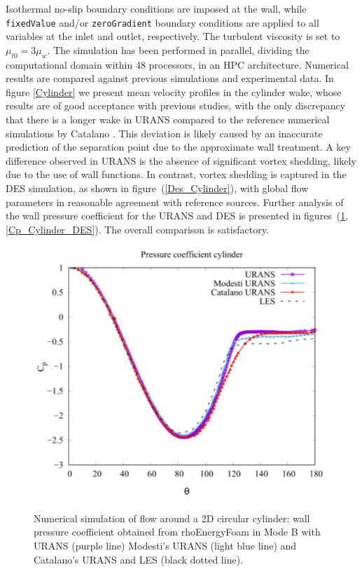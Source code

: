\documentclass[a5paper]{sapthesis}
\begin{document}
	\noindent Isothermal no-slip boundary conditions are imposed at the wall, while \texttt{fixedValue} and/or \texttt{zeroGradient} boundary conditions are applied to all variables at the inlet and outlet, respectively. The turbulent viscosity is set to $\mu_{t0} = 3\mu_w$. The simulation has been performed in parallel, dividing the computational domain within 48 processors, in an HPC architecture. Numerical results are compared against previous simulations and experimental data. In figure \ref{Cylinder} we present mean velocity profiles in the cylinder wake, whose results are of good acceptance with previous studies, with the only discrepancy that there is a longer wake in URANS compared to the reference numerical simulations by Catalano \cite{Catalano}. This deviation is likely caused by an inaccurate prediction of the separation point due to the approximate wall treatment. A key difference observed in URANS is the absence of significant vortex shedding, likely due to the use of wall functions. In contrast, vortex shedding is captured in the DES simulation, as shown in figure~(\ref{Des_Cylinder}), with global flow parameters in reasonable agreement with reference sources. Further analysis of the wall pressure coefficient for the URANS and DES is presented in figures~(\ref{Cp_Cylinder_URANS}, \ref{Cp_Cylinder_DES}). The overall comparison is satisfactory.
		
	\begin{figure}[h]
		\begin{center}
			\hspace{5mm}
			{\includegraphics[width=0.46\linewidth]{Figures/pressure_coeff_cylinder}}  
			\caption[Pressure coefficients for the URANS of the 2D cylinder]{Numerical simulation of ﬂow around a 2D circular cylinder: wall pressure coefficient obtained from rhoEnergyFoam in Mode B with URANS (purple line) Modesti's URANS (light blue line) and Catalano's URANS and LES (black dotted line).}
			\label{Cp_Cylinder_URANS}
		\end{center}
	\end{figure}
	
\end{document}
